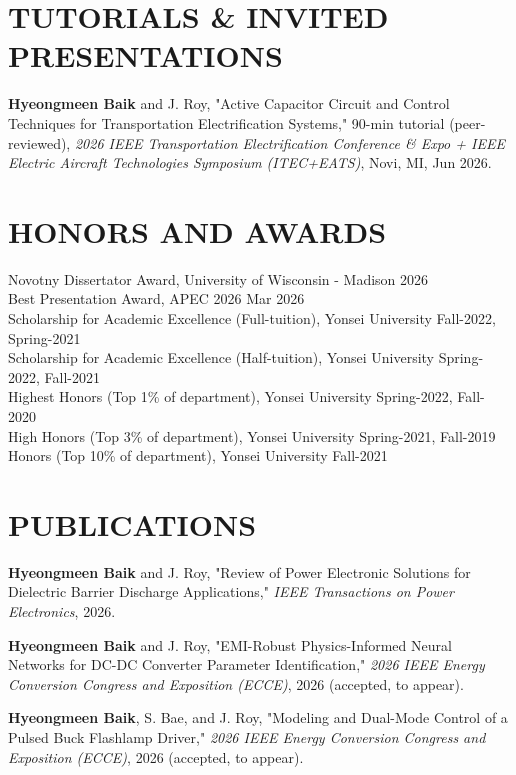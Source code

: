 \documentclass[a4paper,9pt]{extarticle}
\begin{document}

\section*{TUTORIALS \& INVITED PRESENTATIONS}
\noindent
\textbf{Hyeongmeen Baik} and J. Roy, "Active Capacitor Circuit and Control Techniques for Transportation Electrification Systems," 90-min tutorial (peer-reviewed), \textit{2026 IEEE Transportation Electrification Conference \& Expo + IEEE Electric Aircraft Technologies Symposium (ITEC+EATS)}, Novi, MI, Jun 2026.

\section*{HONORS AND AWARDS}
\noindent
Novotny Dissertator Award, University of Wisconsin - Madison \hfill 2026\\
Best Presentation Award, APEC 2026 \hfill Mar 2026\\
Scholarship for Academic Excellence (Full-tuition), Yonsei University \hfill Fall-2022, Spring-2021\\
Scholarship for Academic Excellence (Half-tuition), Yonsei University \hfill Spring-2022, Fall-2021\\
Highest Honors (Top 1\% of department), Yonsei University \hfill Spring-2022, Fall-2020\\
High Honors (Top 3\% of department), Yonsei University \hfill Spring-2021, Fall-2019\\
Honors (Top 10\% of department), Yonsei University \hfill Fall-2021\\

\section*{PUBLICATIONS}
\noindent
\textbf{Hyeongmeen Baik} and J. Roy, "Review of Power Electronic Solutions for Dielectric Barrier Discharge Applications," \textit{IEEE Transactions on Power Electronics}, 2026.

\medskip\noindent
\textbf{Hyeongmeen Baik} and J. Roy, "EMI-Robust Physics-Informed Neural Networks for DC-DC Converter Parameter Identification," \textit{2026 IEEE Energy Conversion Congress and Exposition (ECCE)}, 2026 (accepted, to appear).

\medskip\noindent
\textbf{Hyeongmeen Baik}, S. Bae, and J. Roy, "Modeling and Dual-Mode Control of a Pulsed Buck Flashlamp Driver," \textit{2026 IEEE Energy Conversion Congress and Exposition (ECCE)}, 2026 (accepted, to appear).
\end{document}
